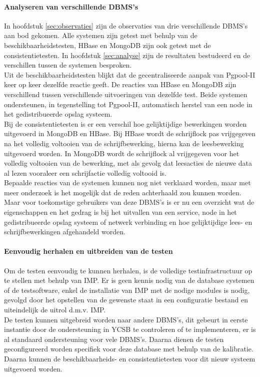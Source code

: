 \paragraph{Analyseren van verschillende DBMS's} In hoofdstuk \ref{sec:observaties} zijn de observaties van drie verschillende DBMS's aan bod gekomen. Alle systemen zijn getest met behulp van de beschikbaarheidstesten, HBase en MongoDB zijn ook getest met de consistentietesten. In hoofdstuk \ref{sec:analyse} zijn de resultaten bestudeerd en de verschillen tussen de systemen besproken. \\
Uit de beschikbaarheidstesten blijkt dat de gecentraliseerde aanpak van Pgpool-II keer op keer dezelfde reactie geeft. De reacties van HBase en MongoDB zijn verschillend tussen verschillende uitvoeringen van dezelfde test. Beide systemen ondersteunen, in tegenstelling tot Pgpool-II, automatisch herstel van een node in het gedistribueerde opslag systeem. \\
Bij de consistentietesten is er een verschil hoe gelijktijdige bewerkingen worden uitgevoerd in MongoDB en HBase. Bij HBase wordt de schrijflock pas vrijgegeven na het volledig voltooien van de schrijfbewerking, hierna kan de leesbewerking uitgevoerd worden. In MongoDB wordt de schrijflock al vrijgegeven voor het volledig voltooien van de bewerking, met als gevolg dat leesacties de nieuwe data al lezen vooraleer een schrijfactie volledig voltooid is. \\
Bepaalde reacties van de systemen kunnen nog niet verklaard worden, maar met meer onderzoek is het mogelijk dat de reden achterhaald zou kunnen worden. Maar voor toekomstige gebruikers van deze DBMS's is er nu een overzicht wat de eigenschappen en het gedrag is bij het uitvallen van een service, node in het gedistribueerde opslag systeem of netwerk verbinding en hoe gelijktijdige lees- en schrijfbewerkingen afgehandeld worden. 

\paragraph{Eenvoudig herhalen en uitbreiden van de testen} Om de testen eenvoudig te kunnen herhalen, is de volledige testinfrastructuur op te stellen met behulp van IMP. Er is geen kennis nodig van de database systemen of de testsoftware, enkel de installatie van IMP met de nodige modules is nodig, gevolgd door het opstellen van de gewenste staat in een configuratie bestand en uiteindelijk de uitrol d.m.v. IMP. \\
De testen kunnen uitgebreid worden naar andere DBMS's, dit gebeurt in eerste instantie door de ondersteuning in YCSB te controleren of te implementeren, er is al standaard ondersteuning voor vele DBMS's. Daarna dienen de testen geconfigureerd worden specifiek voor deze database met behulp van de kalibratie. Daarna kunnen de beschikbaarheids- en consistentietesten voor dit nieuw systeem uitgevoerd worden.  